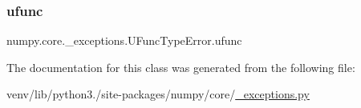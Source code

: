 \subsubsection{\texorpdfstring{ufunc}{ufunc}}
{\footnotesize\ttfamily numpy.\+core.\+\_\+exceptions.\+U\+Func\+Type\+Error.\+ufunc}



The documentation for this class was generated from the following file\+:\begin{DoxyCompactItemize}
\item 
venv/lib/python3./site-\/packages/numpy/core/\hyperlink{__exceptions_8py}{\+\_\+exceptions.\+py}\end{DoxyCompactItemize}
